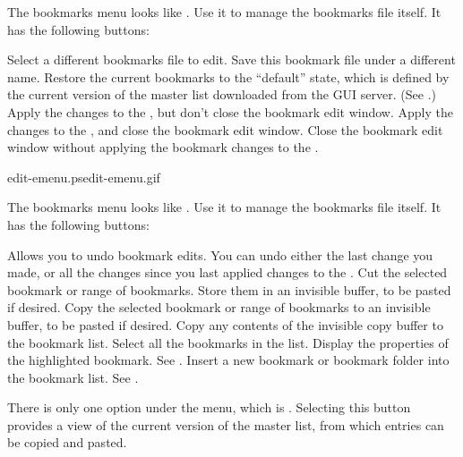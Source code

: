 The bookmarks  menu looks like
.  Use it to manage the bookmarks file
itself.  It has the following buttons:

\begin{description}

 Select a different bookmarks file to
edit.
 Save this bookmark file under a different name.
 Restore the current bookmarks to the
``default'' state, which is defined by the current version of the
master list downloaded from the GUI server.  (See
.) 
 Apply the changes to the \GUI, but don't close
the bookmark edit window.
 Apply the changes to the \GUI, and close
the bookmark edit window.
 Close the bookmark edit window without applying
the bookmark changes to the \GUI.
\end{description}


%
{edit-emenu.ps}{edit-emenu.gif}{}

The bookmarks  menu looks like
.  Use it to manage the bookmarks file
itself.  It has the following buttons:


\begin{description}
 Allows you to undo bookmark edits.  You can undo either
the last change you made, or all the changes since you last applied
changes to the \GUI.
 Cut the selected bookmark or range of bookmarks.  Store
them in an invisible buffer, to be pasted if desired.
 Copy the selected bookmark or range of bookmarks to an
invisible buffer, to be pasted if desired.
 Copy any contents of the invisible copy buffer to the
bookmark list.
 Select all the bookmarks in the list.
 Display the properties of the highlighted
bookmark.  See .
 Insert a new bookmark or bookmark folder into the
bookmark list.  See .
\end{description}


There is only one option under the  menu, which is
.  Selecting this button provides a view of the
current version of the master list, from which entries can be copied
and pasted.

